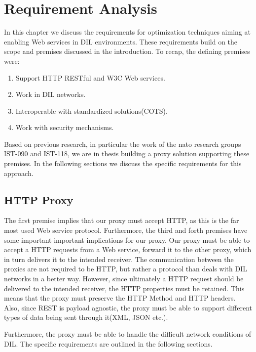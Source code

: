 \chapter{Requirement Analysis}

In this chapter we discuss the requirements for optimization techniques aiming
at enabling Web services in DIL environments. These requirements build on the
scope and premises discussed in the introduction. To recap, the defining
premises were:

\begin{enumerate}
    \item Support HTTP RESTful and W3C Web services.
    \item Work in DIL networks.
    \item Interoperable with standardized solutions(COTS).
    \item Work with security mechanisms.
\end{enumerate}

Based on previous research, in particular the work of the \gls{nato}
research groups IST-090 and IST-118, we are in thesis building a proxy solution
supporting these premises. In the following sections we discuss the specific requirements
for this approach.

\section{HTTP Proxy}

The first premise implies that our proxy must accept HTTP, as this is the far
most used Web service protocol. Furthermore, the third and forth premises have
some important important implications for our proxy. Our proxy must be able to
accept a HTTP requests from a Web service, forward it to the other proxy, which
in turn delivers it to the intended receiver. The communication between the
proxies are not required to be HTTP, but rather a protocol than deals with DIL
networks in a better way. However, since ultimately a HTTP request should be
delivered to the intended receiver, the HTTP properties must be retained. This
means that the proxy must preserve the HTTP Method and HTTP headers. Also, since
REST is payload agnostic, the proxy must be able to support different types of
data being sent through it(XML, JSON etc.).

Furthermore, the proxy must be able to handle the difficult network conditions
of DIL. The specific requirements are outlined in the following sections.

